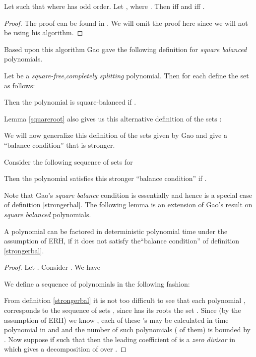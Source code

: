\begin{lemma}\label{squareroot}
	Let  such that  where  has odd order. Let , where . Then  iff  and 
	 iff .
\end{lemma}

\begin{proof}The proof can be found in \cite{gao2001deterministic}. We will omit the proof here since we will not be using his algorithm.
\end{proof}

Based upon this algorithm Gao gave the following definition for \emph{square balanced} polynomials.

\begin{definition}\label{squarebalance}
	Let  be a \emph{square-free},\emph{completely splitting} polynomial. Then for each  define the set  as follows:

	

	Then the polynomial  is square-balanced if .
\end{definition}

\noindent
Lemma \ref{squareroot} also gives us this alternative definition of the sets 
:



We will now generalize this definition of the sets  given by Gao and give a ``balance condition'' that is stronger.

\begin{definition}\label{strongerbal}
	Consider the following sequence of sets for 


Then the polynomial  satisfies this stronger ``balance condition'' if .
\end{definition}

Note that Gao's \emph{square balance} condition is essentially  and hence is a special case of definition \ref{strongerbal}. The following lemma is an extension of Gao's 
result on \emph{square balanced} polynomials.

\begin{lemma}\label{g}
	A polynomial  can be factored in deterministic polynomial time under the assumption of ERH, if it does not satisfy the``balance condition'' of definition \ref{strongerbal}.
   \end{lemma}


\begin{proof}
	Let . Consider . We have

	

	We define a sequence of polynomials  in the following fashion:

	

	From definition \ref{strongerbal} it is not too difficult to see that each polynomial ,  corresponds to the sequence of sets ,  since  has its roots the
	set . 
	     Since (by the assumption of ERH) we know , each of these 
	     's may be calculated in time polynomial in  and
	      and the number of such polynomials ( of them) is bounded by . Now suppose if  such that   then the leading coefficient
	     of  is a \emph{zero divisor} in  which gives a decomposition of  over .
\end{proof}

